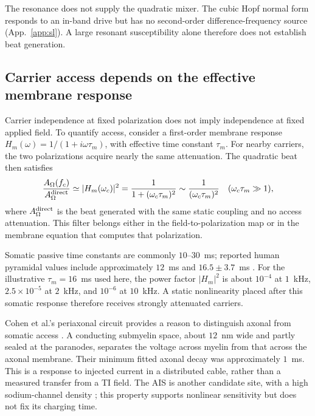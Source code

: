 \documentclass[11pt,a4paper]{article}
\providecommand{\DIFaddtex}[1]{{\protect\color{blue} \sf #1}} %
\providecommand{\DIFaddbegin}{} %
\providecommand{\DIFadd}[1]{\texorpdfstring{\DIFaddtex{#1}}{#1}} %
\begin{document}
The resonance does not supply the quadratic mixer. The cubic Hopf normal form
responds to an in-band drive but has no second-order difference-frequency source
(App.~\ref{app:sl}). A large resonant susceptibility alone therefore does not
establish beat generation.

\subsection{Carrier access depends on the effective membrane response}\label{sec:khz}
Carrier independence at fixed polarization does not imply independence at fixed
applied field. To quantify access, consider a first-order membrane response
$H_m(\omega)=1/(1+i\omega\tau_m)$, with effective time constant $\tau_m$.
For nearby carriers, the two polarizations acquire nearly the same attenuation.
The quadratic beat then satisfies
\begin{equation}
\frac{A_\Omega(f_c)}{A_\Omega^{\rm direct}}
\simeq |H_m(\omega_c)|^2
=\frac{1}{1+(\omega_c\tau_m)^2}
\sim\frac{1}{(\omega_c\tau_m)^2}
\quad(\omega_c\tau_m\gg1),
\label{eq:khz}
\end{equation}
where $A_\Omega^{\rm direct}$ is the beat generated with the same static coupling
and no access attenuation. This filter belongs either in the field-to-polarization
map or in the membrane equation that computes that polarization.

Somatic passive time constants are commonly $10$--$30$~ms; reported human pyramidal
values include approximately $12$~ms \cite{deitcher2017} and $16.5\pm3.7$~ms
\cite{eyal2016}. For the illustrative $\tau_m=16$~ms used here, the power factor
$|H_m|^2$ is about $10^{-4}$ at $1$~kHz, $2.5\times10^{-5}$ at $2$~kHz, and
$10^{-6}$ at $10$~kHz. A static nonlinearity placed after this somatic response
therefore receives strongly attenuated carriers.

\DIFaddbegin \DIFadd{Cohen et al.'s periaxonal circuit provides a reason to distinguish axonal from
somatic access \cite{cohen2020periaxonal}. A conducting submyelin space, about
$12$~nm wide and partly sealed at the paranodes, separates the voltage across
myelin from that across the axonal membrane. Their minimum fitted axonal decay
was approximately $1$~ms. This is a response to injected current in a distributed
cable, rather than a measured transfer from a TI field. The AIS is another candidate
site, with a high sodium-channel density \cite{kole2008ais}; this property supports
nonlinear sensitivity but does not fix its charging time.
}
\end{document}
